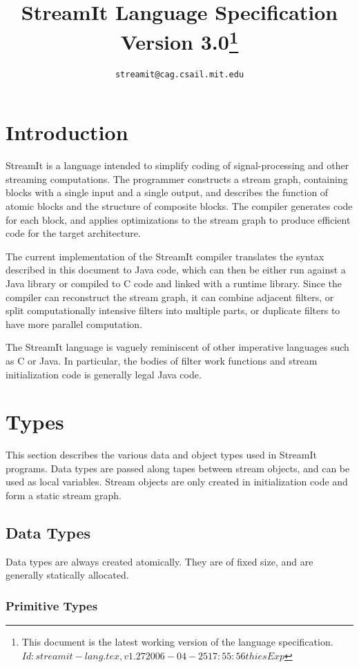 \documentclass[11pt]{article}
\title{StreamIt Language Specification\\
Version 3.0\ifprerel\thanks{
This document is the latest working version of the language specification.\hfil\break\ttfamily
\hbox{$Id: streamit-lang.tex,v 1.27 2006-04-25 17:55:56 thies Exp $}
}\fi}
\author{\texttt{streamit@cag.csail.mit.edu}}
\begin{document}
\maketitle
\tableofcontents

\section{Introduction}

StreamIt is a language intended to simplify coding of
signal-processing and other streaming computations.  The programmer
constructs a stream graph, containing blocks with a single input and a
single output, and describes the function of atomic blocks and the
structure of composite blocks.  The compiler generates code for each
block, and applies optimizations to the stream graph to produce
efficient code for the target architecture.

The current implementation of the StreamIt compiler translates the
syntax described in this document to Java code, which can then be
either run against a Java library or compiled to C code and linked
with a runtime library.  Since the compiler can reconstruct the stream
graph, it can combine adjacent filters, or split computationally
intensive filters into multiple parts, or duplicate filters to have
more parallel computation.

The StreamIt language is vaguely reminiscent of other imperative
languages such as C or Java.  In particular, the bodies of filter work
functions and stream initialization code is generally legal Java
code.

\section{Types}

This section describes the various data and object types used in
StreamIt programs.  Data types are passed along tapes between stream
objects, and can be used as local variables.  Stream objects are only
created in initialization code and form a static stream graph.

\subsection{Data Types}

Data types are always created atomically.  They are of fixed size, and
are generally statically allocated.

\subsubsection{Primitive Types}
\label{sec:primitive-types}
\end{document}
